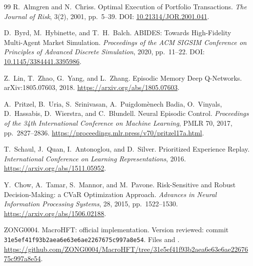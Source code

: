 \documentclass[9pt,a4paper,twocolumn]{extarticle}
\begin{document}
\begin{thebibliography}{99}
  R.~Almgren and N.~Chriss.
  \newblock
  Optimal Execution of Portfolio Transactions.
  \newblock
  \emph{The Journal of Risk}, 3(2), 2001,
  pp.~5--39.
  \newblock
  DOI:
  \href{https://doi.org/10.21314/JOR.2001.041}
  {10.21314/JOR.2001.041}.

  D.~Byrd, M.~Hybinette, and T.~H.~Balch.
  \newblock
  ABIDES: Towards High-Fidelity Multi-Agent
  Market Simulation.
  \newblock
  \emph{Proceedings of the ACM SIGSIM Conference
  on Principles of Advanced Discrete Simulation},
  2020, pp.~11--22.
  \newblock
  DOI:
  \href{https://doi.org/10.1145/3384441.3395986}
  {10.1145/3384441.3395986}.

  Z.~Lin, T.~Zhao, G.~Yang, and L.~Zhang.
  \newblock
  Episodic Memory Deep Q-Networks.
  \newblock
  arXiv:1805.07603, 2018.
  \newblock
  \url{https://arxiv.org/abs/1805.07603}.

  A.~Pritzel, B.~Uria, S.~Srinivasan,
  A.~Puigdom\`enech Badia, O.~Vinyals,
  D.~Hassabis, D.~Wierstra, and C.~Blundell.
  \newblock
  Neural Episodic Control.
  \newblock
  \emph{Proceedings of the 34th International
  Conference on Machine Learning},
  PMLR 70, 2017, pp.~2827--2836.
  \newblock
  \url{https://proceedings.mlr.press/v70/pritzel17a.html}.

  T.~Schaul, J.~Quan, I.~Antonoglou,
  and D.~Silver.
  \newblock
  Prioritized Experience Replay.
  \newblock
  \emph{International Conference
  on Learning Representations}, 2016.
  \newblock
  \url{https://arxiv.org/abs/1511.05952}.

  Y.~Chow, A.~Tamar, S.~Mannor,
  and M.~Pavone.
  \newblock
  Risk-Sensitive and Robust Decision-Making:
  a CVaR Optimization Approach.
  \newblock
  \emph{Advances in Neural Information
  Processing Systems}, 28, 2015,
  pp.~1522--1530.
  \newblock
  \url{https://arxiv.org/abs/1506.02188}.

  ZONG0004.
  \newblock
  MacroHFT: official implementation.
  \newblock
  Version reviewed:
  commit
  \texttt{31e5ef41f93b2aea6e63e6ae2267675c997a8e54}.
  Files
  and .
  \newblock
  \url{https://github.com/ZONG0004/MacroHFT/tree/31e5ef41f93b2aea6e63e6ae2267675c997a8e54}.


\end{thebibliography}
\end{document}
